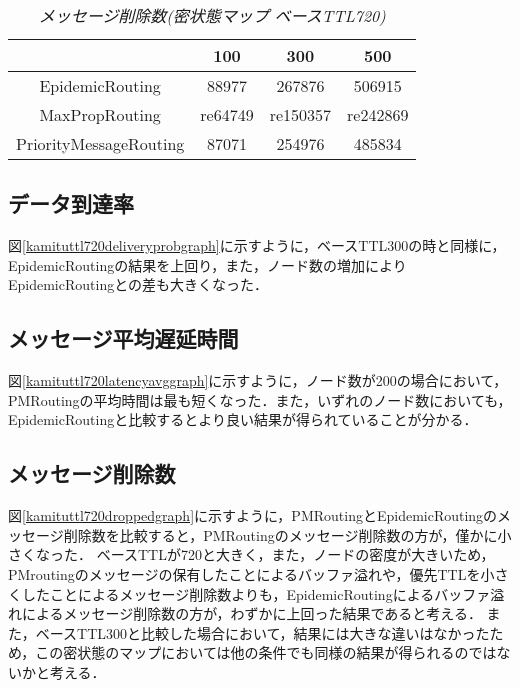 \documentclass[11pt]{icsthesis}
\begin{document}
\begin{table}[H]
 \begin{center}
      \caption[]{\it{メッセージ削除数(密状態マップ ベースTTL720)}}
      \label{kamituttl720dropped}
      \begin{tabular}{|c|c|c|c|}
\hline
&100&300&500\\
\hline
EpidemicRouting&88977&267876&506915\\
\hline
MaxPropRouting&re64749&re150357&re242869\\
\hline
PriorityMessageRouting&87071&254976&485834\\
\hline
      \end{tabular}
    \end{center}
\end{table}
\subsection{データ到達率}
図\ref{kamituttl720deliveryprobgraph}に示すように，ベースTTL300の時と同様に，EpidemicRoutingの結果を上回り，また，ノード数の増加によりEpidemicRoutingとの差も大きくなった．

\subsection{メッセージ平均遅延時間}
図\ref{kamituttl720latencyavggraph}に示すように，ノード数が200の場合において，PMRoutingの平均時間は最も短くなった．また，いずれのノード数においても，EpidemicRoutingと比較するとより良い結果が得られていることが分かる．

\subsection{メッセージ削除数}
図\ref{kamituttl720droppedgraph}に示すように，PMRoutingとEpidemicRoutingのメッセージ削除数を比較すると，PMRoutingのメッセージ削除数の方が，僅かに小さくなった．%
ベースTTLが720と大きく，また，ノードの密度が大きいため，PMroutingのメッセージの保有したことによるバッファ溢れや，優先TTLを小さくしたことによるメッセージ削除数よりも，EpidemicRoutingによるバッファ溢れによるメッセージ削除数の方が，わずかに上回った結果であると考える．
また，ベースTTL300と比較した場合において，結果には大きな違いはなかったため，この密状態のマップにおいては他の条件でも同様の結果が得られるのではないかと考える．
\end{document}
